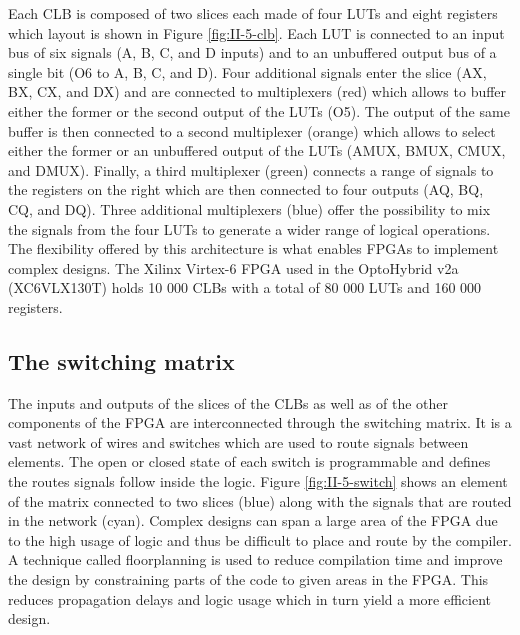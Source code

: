      Each CLB is composed of two slices each made of four LUTs and eight registers which layout is shown in Figure \ref{fig:II-5-clb}. Each LUT is connected to an input bus of six signals (A, B, C, and D inputs) and to an unbuffered output bus of a single bit (O6 to A, B, C, and D). Four additional signals enter the slice (AX, BX, CX, and DX) and are connected to multiplexers (red) which allows to buffer either the former or the second output of the LUTs (O5). The output of the same buffer is then connected to a second multiplexer (orange) which allows to select either the former or an unbuffered output of the LUTs (AMUX, BMUX, CMUX, and DMUX). Finally, a third multiplexer (green) connects a range of signals to the registers on the right which are then connected to four outputs (AQ, BQ, CQ, and DQ). Three additional multiplexers (blue) offer the possibility to mix the signals from the four LUTs to generate a wider range of logical operations. The flexibility offered by this architecture is what enables FPGAs to implement complex designs. The Xilinx Virtex-6 FPGA used in the OptoHybrid v2a (XC6VLX130T) holds 10 000 CLBs with a total of 80 000 LUTs and 160 000 registers.

    \subsection{The switching matrix}

      The inputs and outputs of the slices of the CLBs as well as of the other components of the FPGA are interconnected through the switching matrix. It is a vast network of wires and switches which are used to route signals between elements. The open or closed state of each switch is programmable and defines the routes signals follow inside the logic. Figure \ref{fig:II-5-switch} shows an element of the matrix connected to two slices (blue) along with the signals that are routed in the network (cyan). Complex designs can span a large area of the FPGA due to the high usage of logic and thus be difficult to place and route by the compiler. A technique called floorplanning is used to reduce compilation time and improve the design by constraining parts of the code to given areas in the FPGA. This reduces propagation delays and logic usage which in turn yield a more efficient design.

